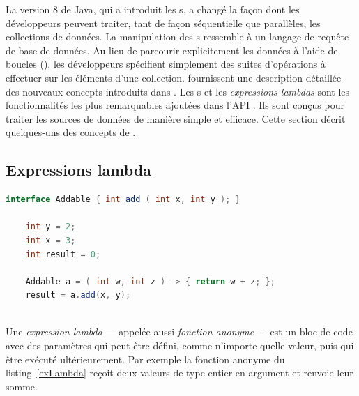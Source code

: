 La version 8 de Java, qui a introduit les s, a chang\'e la façon dont les d\'eveloppeurs peuvent traiter, tant de fa\c{c}on s\'equentielle que parall\`eles, les collections de donn\'ees. La manipulation des s ressemble \`a un langage de requ\^ete de base de donn\'ees. Au lieu de parcourir explicitement les donn\'ees \`a l'aide de boucles (), les d\'eveloppeurs sp\'ecifient simplement des suites d'op\'erations \`a effectuer sur les \'el\'ements d'une collection. \cite{urma2014java} fournissent une description d\'etaill\'ee des nouveaux concepts introduits dans . Les s et les \emph{expressions-lambdas} sont les fonctionnalit\'es les plus remarquables ajout\'ees dans l'API \citep{javaStreamAPI}. Ils sont con\c{c}us pour traiter les sources de donn\'ees de mani\`ere simple et efficace. Cette section d\'ecrit quelques-uns des concepts de .


\subsection{Expressions lambda}



\begin{Listing}[tbp]
\begin{lstlisting}[language=java]
    interface Addable { int add ( int x, int y ); }
    
    int y = 2;
    int x = 3;
    int result = 0;
    
    Addable a = ( int w, int z ) -> { return w + z; };
    result = a.add(x, y);    
    
\end{lstlisting}
\caption{Un exemple dèune expression lambda qui re\c{c}oit deux valeurs de type entier en argument. Le r\'esultat est affect\'e au variable result.}
\label{exLambda}
\end{Listing}

Une \emph{expression lambda} ---  appel\'ee aussi \emph{fonction anonyme} --- est un bloc de code avec des param\`etres qui peut \^etre d\'efini, comme n'importe quelle valeur, puis qui \^etre ex\'ecut\'e ult\'erieurement. Par exemple la fonction anonyme du listing~\ref{exLambda} re\c{c}oit deux valeurs de type entier en argument et renvoie leur somme.


